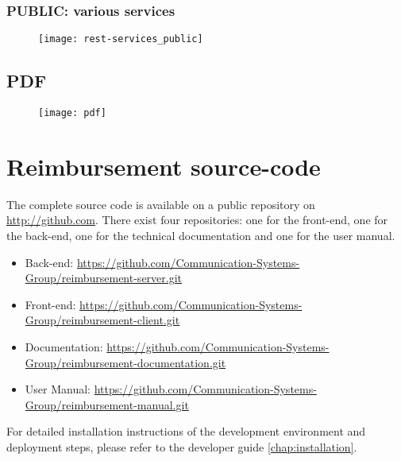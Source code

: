 \subsection{PUBLIC: various services}
\begin{figure}[H]
	{\texttt{[image: rest-services\_public]}}
\end{figure}
\newpage

\section{PDF}
\label{sec:app-pdf}

\begin{figure}[H]
	{\texttt{[image: pdf]}}
\end{figure}
\newpage

\chapter{Reimbursement source-code}
\label{github-source}

The complete source code is available on a public repository on \url{http://github.com}. There exist four repositories: one for the front-end, one for the back-end, one for the technical documentation and one for the user manual.

\begin{itemize}
	\item Back-end: \newline \url{https://github.com/Communication-Systems-Group/reimbursement-server.git}
	\item Front-end: \newline \url{https://github.com/Communication-Systems-Group/reimbursement-client.git}
	\item Documentation: \newline \url{https://github.com/Communication-Systems-Group/reimbursement-documentation.git}
	\item User Manual: \newline \url{https://github.com/Communication-Systems-Group/reimbursement-manual.git}
\end{itemize}

For detailed installation instructions of the development environment and deployment steps, please refer to the developer guide \ref{chap:installation}.
